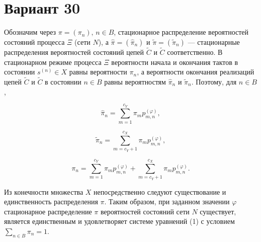 \documentclass{article}
\begin{document}
\section*{Вариант 30}

Обозначим через \( \pi = (\pi_n), \, n \in B \), стационарное распределение вероятностей состояний процесса \( \Xi \) (сети \( N \)), а \( \hat{\pi} = (\hat{\pi}_n) \) и \( \tilde{\pi} = (\tilde{\pi}_n) \) — стационарные распределения вероятностей состояний цепей \( \tilde{C} \) и \( \tilde{C} \) соответственно. В стационарном режиме процесса \( \Xi \) вероятности начала и окончания тактов в состоянии \( s^{(n)} \in X \) равны вероятности \( \pi_n \), а вероятности окончания реализаций цепей \( \tilde{C} \) и \( \tilde{C} \) в состоянии \( n \in B \) равны вероятностям \( \hat{\pi}_n \) и \( \tilde{\pi}_n \). Поэтому, для \( n \in B \),

\[
\hat{\pi}_n = \sum_{m=1}^{c_Y} \pi_m p_{m,n}^{(\varphi)},
\]

\[
\tilde{\pi}_n = \sum_{m=c_Y+1}^{c_X} \pi_m p_{m,n}^{(\varphi)}, \tag{1}
\]

\[
\pi_n = \sum_{m=1}^{c_Y} \pi_m p_{m,n}^{(\varphi)} + \sum_{m=c_Y+1}^{c_X} \pi_m p_{m,n}^{(\varphi)}.
\]

Из конечности множества \( X \) непосредственно следуют существование и единственность распределения \( \pi \). Таким образом, при заданном значении \( \varphi \) стационарное распределение \( \pi \) вероятностей состояний сети \( N \) существует, является единственным и удовлетворяет системе уравнений (1) с условием \( \sum_{n \in B} \pi_n = 1 \).
\end{document}
